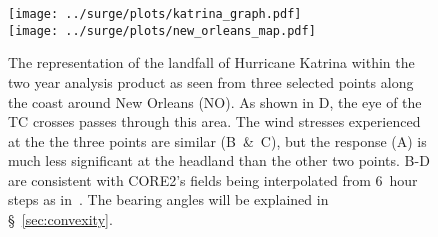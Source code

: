 
\begin{figure}[htb!]
\centering
\texttt{[image: ../surge/plots/katrina\_graph.pdf]}\\
\vspace{-9pt}
\texttt{[image: ../surge/plots/new\_orleans\_map.pdf]}
\caption{The representation of the landfall of Hurricane Katrina within the
two year analysis product as seen from three selected points along
the coast around New Orleans (NO). As shown in D, the eye of the TC
crosses passes through this area. The wind stresses experienced at the
the three points are similar (B~\&~C), but the response (A) is much
less significant at the headland than the other two points.
B-D are consistent with CORE2's fields being interpolated from 6~hour
steps as in~\cite{core2expert}.
The bearing angles will be explained in §~\ref{sec:convexity}.
}
\label{fig:katrina}
\end{figure}
